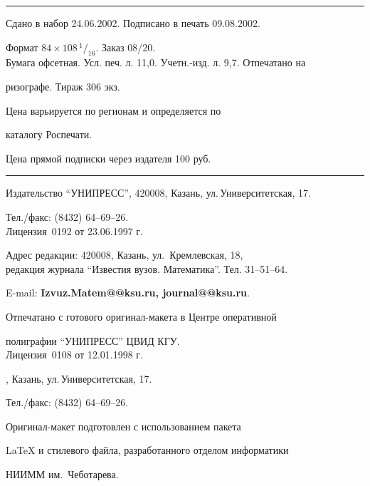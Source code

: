 \bigskip 


\hrule 


\setlength{\hoffset}{-23mm}


\bigskip


\noindent Сдано в набор 24.06.2002. Подписано в печать 09.08.2002.


Формат $84\times 108 \,^1/_{16}.$ Заказ 08/20.\\


Бумага офсетная. Усл. печ. л. 11,0. Учетн.-изд. л. 9,7. Отпечатано на 


ризографе. Тираж 306 экз.





\noindent Цена варьируется по регионам и определяется по 


каталогу Роспечати. 





\noindent Цена прямой подписки через издателя 100 руб. 


\bigskip


\hrule


\bigskip


\noindent Издательство ``УНИПРЕСС'', 420008, Казань, ул.\,Университетская, 17.


Тел./факс: (8432) 64--69--26.\\


Лицензия \No\,0192 от 23.06.1997 г.


\smallskip





\noindent Адрес редакции: 420008, Казань, ул.~Кремлевская, 18,\\  


редакция журнала  ``Известия вузов. Математика''. Тел. 31--51--64.





\noindent E-mail: {\bf Izvuz.Matem@@ksu.ru, journal@@ksu.ru}. \par


\bigskip 


\noindent Отпечатано с готового оригинал-макета в Центре оперативной


полиграфии ``УНИПРЕСС'' ЦВИД КГУ. \\


Лицензия \No\,0108 от 12.01.1998 г.





, Казань, ул.\,Университетская, 17.


Тел./факс: (8432) 64--69--26. \par


\bigskip


\noindent Оригинал-макет подготовлен с использованием пакета


\AmS\LaTeX{} и стилевого файла, разработанного отделом информатики


НИИММ им.~Чеботарева.








